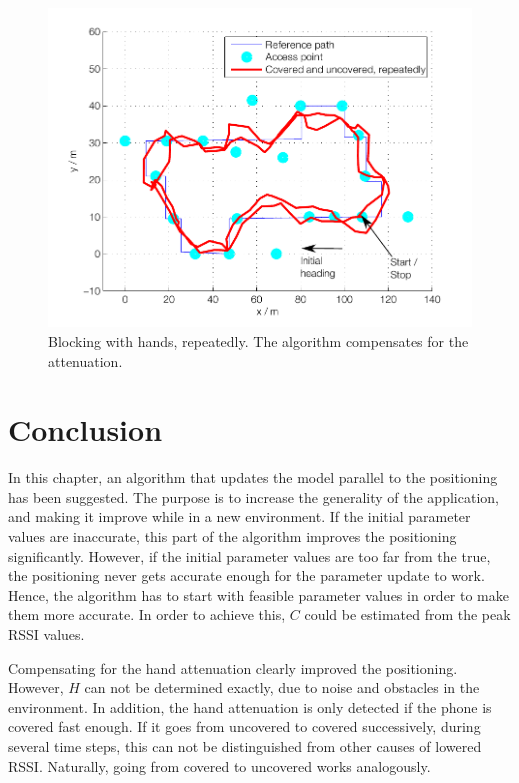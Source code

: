\documentclass{LTHthesis}
\begin{document}
\begin{figure}[!htb]

\includegraphics[width=1\textwidth ]{images/adapt_parameters/hand_block_repeatedly_comp}
\caption{Blocking with hands, repeatedly. The algorithm compensates for the attenuation.}\label{hand_block_repeatedly_comp}
\end{figure}


\section{Conclusion}
In this chapter, an algorithm that updates the model parallel to the positioning has been suggested. The purpose is to increase the generality of the application, and making it improve while in a new environment. If the initial parameter values are inaccurate, this part of the algorithm improves the positioning significantly. However, if the initial parameter values are too far from the true, the positioning never gets accurate enough for the parameter update to work. Hence, the algorithm has to start with feasible parameter values in order to make them more accurate. In order to achieve this, $C$ could be estimated from the peak RSSI values.


Compensating for the hand attenuation clearly improved the positioning. However, $H$ can not be determined exactly, due to noise and obstacles in the environment. In addition, the hand attenuation is only detected if the phone is covered fast enough. If it goes from uncovered to covered successively, during several time steps, this can not be distinguished from other causes of lowered RSSI. Naturally, going from covered to uncovered works analogously.
\end{document}
